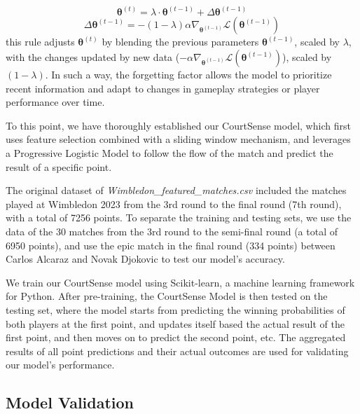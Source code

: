 \documentclass[12pt]{article}  %
\begin{document}
\[
\mathbf{\theta}^{(t)} = \lambda \cdot \mathbf{\theta}^{(t-1)} +  \Delta\mathbf{\theta}^{(t-1)}
\]
\[ 
\Delta\mathbf{\theta}^{(t-1)} = - (1 - \lambda) \alpha \nabla_{\mathbf{\theta}^{(t-1)}} \mathcal{L}(\mathbf{\theta}^{(t-1)})
\]
this rule adjusts $\mathbf{\theta}^{(t)}$ by blending the previous parameters  \( \mathbf{\theta}^{(t-1)} \), scaled by \( \lambda \), with the changes updated by new data (\( - \alpha \nabla_{\mathbf{\theta}^{(t-1)}} \mathcal{L}(\mathbf{\theta}^{(t-1)}) \)), scaled by $ (1 - \lambda) $. In such a way, the forgetting factor allows the model to prioritize recent information and adapt to changes in gameplay strategies or player performance over time.

To this point, we have thoroughly established our CourtSense model, which first uses feature selection combined with a sliding window mechanism, and leverages a Progressive Logistic Model to follow the flow of the match and predict the result of a specific point. 

The original dataset of \textit{Wimbledon\_featured\_matches.csv} included the matches played at Wimbledon 2023 from the 3rd round to the final round (7th round), with a total of 7256 points. To separate the training and testing sets, we use the data of the 30 matches from the 3rd round to the semi-final round (a total of 6950 points), and use the epic match in the final round (334 points) between Carlos Alcaraz and Novak Djokovic to test our model's accuracy.

We train our CourtSense model using Scikit-learn, a machine learning framework for Python. After pre-training, the CourtSense Model is then tested on the testing set, where the model starts from predicting the winning probabilities of both players at the first point, and updates itself based the actual result of the first point, and then moves on to predict the second point, etc. The aggregated results of all point predictions and their actual outcomes are used for validating our model's performance.

\subsection{Model Validation}
\end{document}
